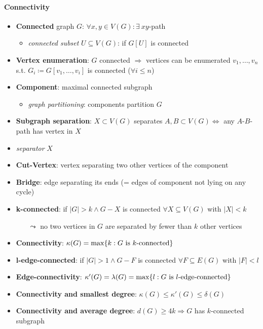 \paragraph{Connectivity}
\begin{itemize}
  \item \textbf{Connected} graph $ G $: $ \forall x,y \in V(G) : \exists \ xy $-path
  \begin{itemize}
    \item \emph{connected subset} $ U \subseteq V(G) $: if $ G[U] $ is connected  
  \end{itemize}
  \item \textbf{Vertex enumeration}: $ G $ connected $ \Rightarrow $ vertices can be enumerated $ v_1, \dots, v_n $ s.t. $ G_i \coloneqq G[v_1, \dots, v_i] $ is connected ($ \forall i \leq n $)
  \item \textbf{Component}: maximal connected subgraph
  \begin{itemize}
    \item \emph{graph partitioning}: components partition $ G $ 
  \end{itemize}
  \item \textbf{Subgraph separation}: $ X \subset V(G) $ separates $ A,B \subset V(G) \Leftrightarrow $ any $ A $-$ B $-path has vertex in $ X $
  \item \emph{separator} $ X $
  \item \textbf{Cut-Vertex}: vertex separating two other vertices of the component
  \item \textbf{Bridge}: edge separating its ends (= edges of component not lying on any cycle)
  \item \textbf{k-connected}: if $ \vert G \vert > k \wedge G - X $ is connected $ \forall X \subseteq V(G) $ with $ \vert X \vert < k $
  \begin{itemize}
    \item[$ \leadsto $] no two vertices in $ G $ are separated by fewer than $ k $ other vertices
  \end{itemize}
  \item \textbf{Connectivity}: $ \kappa(G) = \max\{ k : G \text{ is $ k $-connected} \} $
  \item \textbf{l-edge-connected}: if $ \vert G \vert > 1 \wedge G - F $ is connected $ \forall F \subseteq E(G) $ with $ \vert F \vert < l $
  \item \textbf{Edge-connectivity}: $ \kappa'(G) = \lambda(G) = \max\{ l : G \text{ is $ l $-edge-connected} \} $
  \item \textbf{Connectivity and smallest degree}: $ \kappa(G) \leq \kappa'(G) \leq \delta(G) $
  \item \textbf{Connectivity and average degree}: $ d(G) \geq 4k \Rightarrow G $ has $ k $-connected subgraph
\end{itemize}

